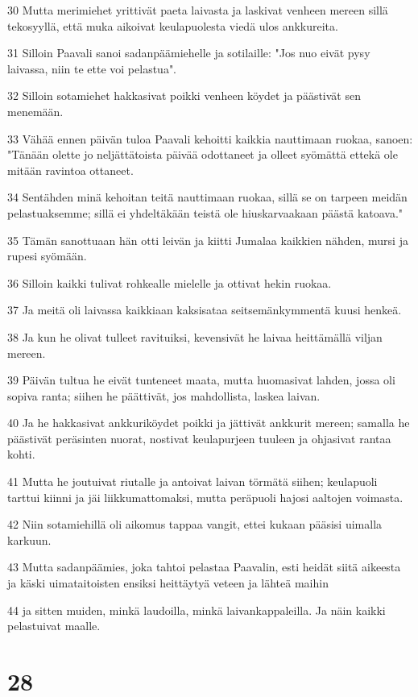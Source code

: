 \par 30 Mutta merimiehet yrittivät paeta laivasta ja laskivat venheen mereen sillä tekosyyllä, että muka aikoivat keulapuolesta viedä ulos ankkureita.
\par 31 Silloin Paavali sanoi sadanpäämiehelle ja sotilaille: "Jos nuo eivät pysy laivassa, niin te ette voi pelastua".
\par 32 Silloin sotamiehet hakkasivat poikki venheen köydet ja päästivät sen menemään.
\par 33 Vähää ennen päivän tuloa Paavali kehoitti kaikkia nauttimaan ruokaa, sanoen: "Tänään olette jo neljättätoista päivää odottaneet ja olleet syömättä ettekä ole mitään ravintoa ottaneet.
\par 34 Sentähden minä kehoitan teitä nauttimaan ruokaa, sillä se on tarpeen meidän pelastuaksemme; sillä ei yhdeltäkään teistä ole hiuskarvaakaan päästä katoava."
\par 35 Tämän sanottuaan hän otti leivän ja kiitti Jumalaa kaikkien nähden, mursi ja rupesi syömään.
\par 36 Silloin kaikki tulivat rohkealle mielelle ja ottivat hekin ruokaa.
\par 37 Ja meitä oli laivassa kaikkiaan kaksisataa seitsemänkymmentä kuusi henkeä.
\par 38 Ja kun he olivat tulleet ravituiksi, kevensivät he laivaa heittämällä viljan mereen.
\par 39 Päivän tultua he eivät tunteneet maata, mutta huomasivat lahden, jossa oli sopiva ranta; siihen he päättivät, jos mahdollista, laskea laivan.
\par 40 Ja he hakkasivat ankkuriköydet poikki ja jättivät ankkurit mereen; samalla he päästivät peräsinten nuorat, nostivat keulapurjeen tuuleen ja ohjasivat rantaa kohti.
\par 41 Mutta he joutuivat riutalle ja antoivat laivan törmätä siihen; keulapuoli tarttui kiinni ja jäi liikkumattomaksi, mutta peräpuoli hajosi aaltojen voimasta.
\par 42 Niin sotamiehillä oli aikomus tappaa vangit, ettei kukaan pääsisi uimalla karkuun.
\par 43 Mutta sadanpäämies, joka tahtoi pelastaa Paavalin, esti heidät siitä aikeesta ja käski uimataitoisten ensiksi heittäytyä veteen ja lähteä maihin
\par 44 ja sitten muiden, minkä laudoilla, minkä laivankappaleilla. Ja näin kaikki pelastuivat maalle.

\chapter{28}

